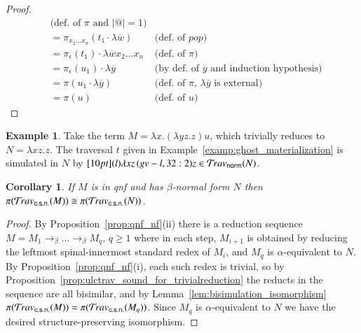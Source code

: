 \documentclass{elsarticle}
\theoremstyle{plain}
\newtheorem{corollary}[theorem]{Corollary}
\theoremstyle{definition}
\newtheorem{example}{Example}[section]
\newcommand{\normalizing}{{\sf norm}}
\newcommand{\travsetnorm}{\travset_\normalizing} %
\newcommand{\travsetscn}{\travset_{\sf c.s.n.}} %
\def\coresymbol{\pi} %
\newcommand{\core}[1]{\coresymbol(#1)} %
\begin{document}
\begin{proof}
\begin{align*}
            & \mbox{(def.~of $\coresymbol$ and $|@|=1$)}
        \\
        &=  \coresymbol_{x_2\ldots x_n}(t_1 \cdot \lambda\overline{w})
        & \mbox{(def.~of $pop$)}
        \\
        &=  \coresymbol_{\epsilon}(t_1) \cdot \lambda\overline{w} x_2\ldots x_n
            & \mbox{(def.~of $\coresymbol$)}
        \\
            &= \coresymbol_{\epsilon}(u_1) \cdot \lambda\overline{y}
            & \mbox{(by def.~of $\overline{y}$ and induction hypothesis)}
        \\
        &= \coresymbol(u_1 \cdot \lambda\overline{y})
            & \mbox{(def.~of $\coresymbol$, $\lambda\overline{y}$ is external)}
        \\
        &= \coresymbol(u)
            & \mbox{(def.~of $u$)}
    \end{align*}
\fi
\end{proof}

\begin{example}
    Take the term $M = \lambda x. (\lambda y z.z) u$, which trivially reduces to $N = \lambda x z . z$. The traversal $t$ given in Example~\ref{examp:ghost_materialization}
    is simulated in $N$ by $\Pstr[10pt]{ (l){\lambda x z} \, (gv-l,32:2){z} } \in \travsetnorm(N)$.
\end{example}


\begin{corollary}
\label{cor:qnf_and_nf_traveset_invariant}
If $M$ is in \emph{qnf} and has $\beta$-normal form $N$ then $\coresymbol(\travsetscn(M)) \cong \coresymbol(\travsetscn(N))$.
\end{corollary}
\begin{proof}
By Proposition~\ref{prop:qnf_nf}(ii) %
 there is a reduction sequence $M = M_1 \rightarrow_\beta \ldots \rightarrow_\beta M_q$, $q\geq1$  where in each step, $M_{i+1}$ is obtained by reducing the leftmost spinal-innermost standard redex of $M_i$,
and $M_q$ is $\alpha$-equivalent to $N$.
By Proposition~\ref{prop:qnf_nf}(i), each such redex is trivial, so by Proposition~\ref{prop:ulctrav_sound_for_trivialreduction}
the reducts in the sequence are all bisimilar, and by Lemma~\ref{lem:bisimulation_isomorphism}
$\core{\travsetscn(M)} = \core{\travsetscn(M_q)}$. Since $M_q$ is $\alpha$-equivalent to $N$ we have the desired structure-preserving isomorphism.
\end{proof}
\end{document}
